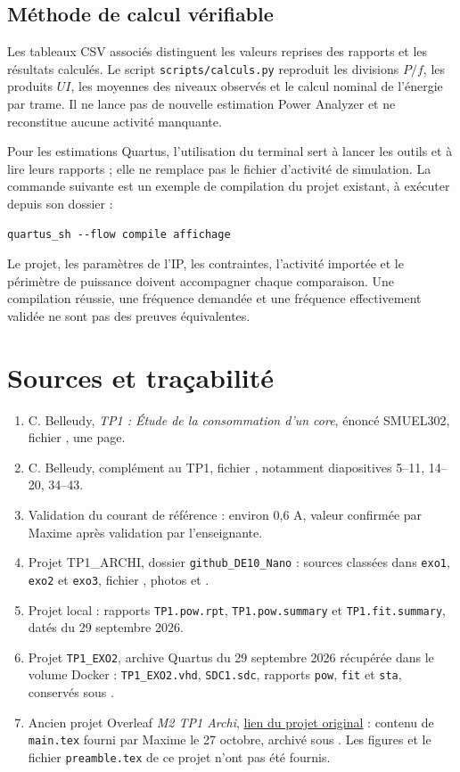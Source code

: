 \documentclass[11pt,a4paper]{article}
\begin{document}
\subsection{Méthode de calcul vérifiable}
Les tableaux CSV associés distinguent les valeurs reprises des rapports et les résultats calculés. Le script \texttt{scripts/calculs.py} reproduit les divisions $P/f$, les produits $UI$, les moyennes des niveaux observés et le calcul nominal de l'énergie par trame. Il ne lance pas de nouvelle estimation Power Analyzer et ne reconstitue aucune activité manquante.

Pour les estimations Quartus, l'utilisation du terminal sert à lancer les outils et à lire leurs rapports ; elle ne remplace pas le fichier d'activité de simulation. La commande suivante est un exemple de compilation du projet existant, à exécuter depuis son dossier :
\begin{lstlisting}
quartus_sh --flow compile affichage
\end{lstlisting}
Le projet, les paramètres de l'IP, les contraintes, l'activité importée et le périmètre de puissance doivent accompagner chaque comparaison. Une compilation réussie, une fréquence demandée et une fréquence effectivement validée ne sont pas des preuves équivalentes.

\newpage
\section*{Sources et traçabilité}
\begin{enumerate}
\item C. Belleudy, \emph{TP1 : Étude de la consommation d'un core}, énoncé SMUEL302, fichier , une page.
\item C. Belleudy, complément au TP1, fichier , notamment diapositives 5--11, 14--20, 34--43.
\item Validation du courant de référence : environ 0,6 A, valeur confirmée par Maxime après validation par l'enseignante.
\item Projet TP1\_ARCHI, dossier \texttt{github\_DE10\_Nano} : sources classées dans \texttt{exo1}, \texttt{exo2} et \texttt{exo3}, fichier , photos et .
\item Projet local  : rapports \texttt{TP1.pow.rpt}, \texttt{TP1.pow.summary} et \texttt{TP1.fit.summary}, datés du 29 septembre 2026.
\item Projet \texttt{TP1\_EXO2}, archive Quartus du 29 septembre 2026 récupérée dans le volume Docker : \texttt{TP1\_EXO2.vhd}, \texttt{SDC1.sdc}, rapports \texttt{pow}, \texttt{fit} et \texttt{sta}, conservés sous .
\item Ancien projet Overleaf \emph{M2 TP1 Archi}, \href{https://www.overleaf.com/project/6ab3907904aa18e619729093}{lien du projet original} : contenu de \texttt{main.tex} fourni par Maxime le 27 octobre, archivé sous . Les figures et le fichier \texttt{preamble.tex} de ce projet n'ont pas été fournis.
\end{enumerate}
\end{document}
